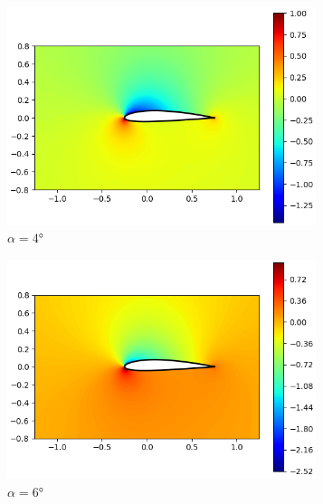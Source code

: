 \documentclass[letterpaper, openright, 12pt]{book}
\begin{document}
    \begin{figure}[htbp!]
        \centering
        \begin{subfigure}[c]{0.48\textwidth}
            \includegraphics[keepaspectratio, width=0.99\textwidth]
                {./img/potential_flow_2412_cp_4}
            \caption{$\alpha = 4\si{\degree}$}
            \label{fig:potential_flow_2412_cp_4}
        \end{subfigure}
        \hfill
        \begin{subfigure}[c]{0.48\textwidth}
            \includegraphics[keepaspectratio, width=0.99\textwidth]
                {./img/potential_flow_2412_cp_6}
            \caption{$\alpha = 6\si{\degree}$}
            \label{fig:potential_flow_2412_cp_6}
        \end{subfigure}
        \begin{subfigure}[c]{0.48\textwidth}

\end{subfigure}
\end{figure}
\end{document}
